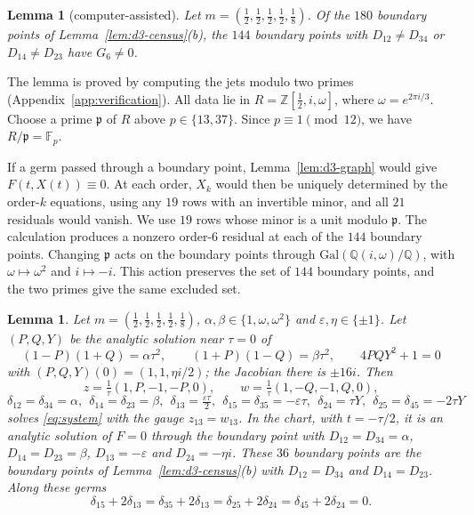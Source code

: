 \documentclass[Threeside,11pt]{article}
\newtheorem{lemma}[theorem]{Lemma}
\theoremstyle{definition}
\theoremstyle{remark}
\numberwithin{equation}{section}
\theoremstyle{remark}
\begin{document}
\begin{lemma}[computer-assisted]\label{lem:d3-order6}
Let $m=(\frac12,\frac12,\frac12,\frac12,\frac18)$.  Of the $180$ boundary points of
Lemma~\ref{lem:d3-census}(b), the $144$ boundary points with $D_{12}\ne D_{34}$ or $D_{14}\ne D_{23}$ have
$G_6\neq0$.
\end{lemma}

{The lemma is proved by computing the jets modulo two primes
(Appendix~\ref{app:verification}). All data lie in $R=\mathbb Z[\frac12,i,\omega]$,
where $\omega=e^{2\pi i/3}$. Choose a prime $\mathfrak p$ of $R$ above $p\in\{13,37\}$.
Since $p\equiv1\pmod{12}$, we have $R/\mathfrak p=\mathbb F_p$.

If a germ passed through a boundary point, Lemma~\ref{lem:d3-graph} would give $F(t,X(t))\equiv0$.
At each order, $X_k$ would then be uniquely determined by the order-$k$ equations,
using any $19$ rows with an invertible minor, and all $21$ residuals would vanish.
We use $19$ rows whose minor is a unit modulo $\mathfrak p$.
The calculation produces a nonzero order-$6$ residual at each of the $144$ boundary points.
Changing $\mathfrak p$ acts on the boundary points through $\mathrm{Gal}(\mathbb Q(i,\omega)/\mathbb Q)$,
with $\omega\mapsto\omega^2$ and $i\mapsto-i$. This action preserves the set of $144$ boundary points,
and the two primes give the same excluded set.}

{\begin{lemma}\label{lem:d3-twisted}
Let $m=(\frac12,\frac12,\frac12,\frac12,\frac18)$, $\alpha,\beta\in\{1,\omega,\omega^2\}$ and
$\varepsilon,\eta\in\{\pm1\}$.  Let $(P,Q,Y)$ be the analytic solution near $\tau=0$ of
\[
(1-P)(1+Q)=\alpha\tau^2,\qquad (1+P)(1-Q)=\beta\tau^2,\qquad 4PQY^2+1=0
\]
with $(P,Q,Y)(0)=(1,1,\eta i/2)$; the Jacobian there is $\pm16i$.  Then
\[
z=\tfrac1\tau(1,P,-1,-P,0),\qquad w=\tfrac1\tau(1,-Q,-1,Q,0),
\]
\[
\delta_{12}=\delta_{34}=\alpha,\ \ \delta_{14}=\delta_{23}=\beta,\ \
\delta_{13}=\tfrac{\varepsilon\tau}2,\ \ \delta_{15}=\delta_{35}=-\varepsilon\tau,\ \
\delta_{24}=\tau Y,\ \ \delta_{25}=\delta_{45}=-2\tau Y
\]
solves \eqref{eq:system} with the gauge $z_{13}=w_{13}$.  In the chart, with $t=-\tau/2$, it is an
analytic solution of $F=0$ through the boundary point with $D_{12}=D_{34}=\alpha$, $D_{14}=D_{23}=\beta$,
$D_{13}=-\varepsilon$ and $D_{24}=-\eta i$.  These $36$ boundary points are the boundary points of
Lemma~\ref{lem:d3-census}(b) with $D_{12}=D_{34}$ and $D_{14}=D_{23}$.  Along these germs
\begin{equation}\label{eq:d3-identities}
\delta_{15}+2\delta_{13}=\delta_{35}+2\delta_{13}=\delta_{25}+2\delta_{24}=\delta_{45}+2\delta_{24}=0 .
\end{equation}
\end{lemma}}
\end{document}
